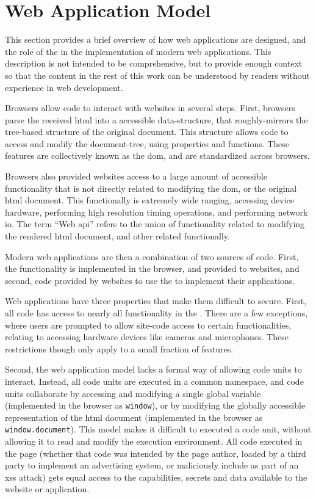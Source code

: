 \section{Web Application Model}
\label{background:web-application-model}

This section provides a brief overview of how web applications are designed,
and the role of the \WAPI in the implementation of modern web applications.
This description is not intended to be comprehensive, but to provide enough
context so that the content in the rest of this work can be understood
by readers without experience in web development.

Browsers allow \JS code to interact with websites in several steps. First,
browsers parse the received \gls{html} into a \JS accessible data-structure,
that roughly-mirrors the tree-based structure of the original document.
This structure allows \JS code to access and modify the document-tree,
using \JS properties and functions.  These \JS features are collectively known
as the \gls{dom}, and are standardized across browsers.

Browsers also provided websites access to a large amount of \JS accessible
functionality that is not directly related to modifying the \gls{dom}, or
the original \gls{html} document.  This functionally is extremely wide ranging,
accessing device hardware, performing high resolution timing operations, and
performing network \gls{io}.  The term ``Web \gls{api}'' refers to the union of
functionality related to modifying the rendered \gls{html} document, and
other \JS related functionally.

Modern web applications are then a combination of two sources of code.
First, the \WAPI functionality is implemented in the browser, and provided
to websites, and second, \JS code provided by websites to use the \WAPI
to implement their applications.

Web applications have three properties that make them difficult to secure.
First, all \JS code has access to nearly all functionality in the \WAPI.
There are a few exceptions, where users are
prompted to allow site-code access to certain functionalities, relating
to accessing hardware devices like cameras and microphones.  These restrictions
though only apply to a small fraction of \WAPI features.

Second, the web application model lacks a formal
way of allowing code units to interact.  Instead, all code units are
executed in a common namespace, and code units collaborate by accessing and
modifying a single global variable (implemented in the browser as
\texttt{window}), or by modifying the globally accessible representation of the
\gls{html} document (implemented in the browser as \texttt{window.document}).
This model makes it difficult to executed a code unit, without allowing
it to read and modify the execution environment.  All code executed in the
page (whether that code was intended by the page author, loaded by a third
party to implement an advertising system, or maliciously include as part of
an \gls{xss} attack) gets equal access to the capabilities, secrets and data
available to the website or application.

